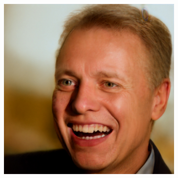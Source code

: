 \begin{figure}[h!]
\begin{subfigure}[b]{0.24\textwidth}
    \end{subfigure}
    \begin{subfigure}[b]{0.24\textwidth}
        \includegraphics[width=\textwidth]{fig/stylegan/faceedit/uffe-smile}
    \end{subfigure}


\end{figure}
